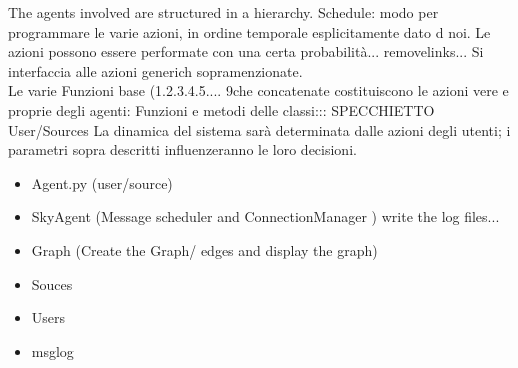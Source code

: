 The agents involved are structured in a hierarchy. 
Schedule: modo per programmare le varie azioni, in ordine temporale esplicitamente dato d noi.  Le azioni possono essere performate con una certa probabilità... removelinks...
Si interfaccia alle azioni generich sopramenzionate.
\\
Le varie Funzioni base (1.2.3.4.5....  9che concatenate costituiscono le azioni vere e proprie degli agenti: Funzioni e metodi delle classi::: SPECCHIETTO
User/Sources
La dinamica del sistema sarà determinata dalle azioni degli utenti; i parametri sopra descritti
influenzeranno le loro decisioni.
\begin{itemize}
\item Agent.py   (user/source) 
\item SkyAgent  (Message scheduler and ConnectionManager ) write the log files...
\item Graph (Create the Graph/ edges and display the graph)
\item Souces
\item Users

\item msglog
\end{itemize}
